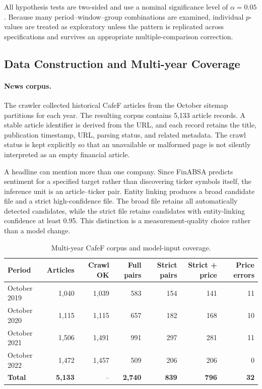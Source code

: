 \documentclass[12pt,a4paper]{article}
\begin{document}
All hypothesis tests are two-sided and use a nominal significance level of $\alpha=0.05$. Because many period--window--group combinations are examined, individual $p$-values are treated as exploratory unless the pattern is replicated across specifications and survives an appropriate multiple-comparison correction.

\subsection{Data Construction and Multi-year Coverage}
\label{subsec:multi-year-data}

\paragraph{News corpus.}
The crawler collected historical CafeF articles from the October sitemap partitions for each year. The resulting corpus contains 5,133 article records. A stable article identifier is derived from the URL, and each record retains the title, publication timestamp, URL, parsing status, and related metadata. The crawl status is kept explicitly so that an unavailable or malformed page is not silently interpreted as an empty financial article.

A headline can mention more than one company. Since FinABSA predicts sentiment for a specified target rather than discovering ticker symbols itself, the inference unit is an article--ticker pair. Entity linking produces a broad candidate file and a strict high-confidence file. The broad file retains all automatically detected candidates, while the strict file retains candidates with entity-linking confidence at least 0.95. This distinction is a measurement-quality choice rather than a model change.

\begin{table}[htbp]
\centering
\small
\caption{Multi-year CafeF corpus and model-input coverage.}
\label{tab:multi-year-news-coverage}
\begin{tabular}{lrrrrrr}
\toprule
\textbf{Period} & \textbf{Articles} & \textbf{Crawl OK} & \textbf{Full pairs} & \textbf{Strict pairs} & \textbf{Strict + price} & \textbf{Price errors} \\
\midrule
October 2019 & 1,040 & 1,039 & 583 & 154 & 141 & 11 \\
October 2020 & 1,115 & 1,115 & 657 & 182 & 168 & 10 \\
October 2021 & 1,506 & 1,491 & 991 & 297 & 281 & 11 \\
October 2022 & 1,472 & 1,457 & 509 & 206 & 206 & 0 \\
\midrule
\textbf{Total} & \textbf{5,133} & -- & \textbf{2,740} & \textbf{839} & \textbf{796} & \textbf{32} \\
\bottomrule
\end{tabular}
\end{table}
\end{document}
